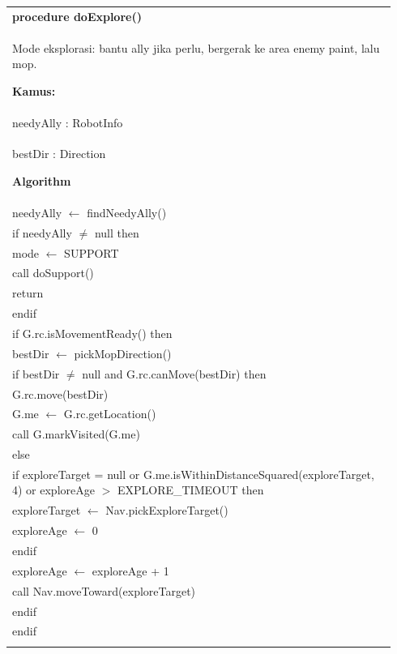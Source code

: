 \documentclass{article}
\newenvironment{pseudobox}
{
\centering
\begin{longtable}{|p{0.94\linewidth}|}
\hline
}
{
\\ \hline
\end{longtable}
\vspace{0.05cm}
}
\begin{document}
\begin{pseudobox}
\textbf{procedure doExplore()} \\
{ Mode eksplorasi: bantu ally jika perlu, bergerak ke area enemy paint, lalu mop. }

\textbf{Kamus:} \\
\hspace*{1em} needyAlly : RobotInfo \\
\hspace*{1em} bestDir : Direction

\textbf{Algorithm} \\
\hspace*{1em} needyAlly $\leftarrow$ findNeedyAlly() \\
\hspace*{1em} if needyAlly $\neq$ null then \\
\hspace*{2em} mode $\leftarrow$ SUPPORT \\
\hspace*{2em} call doSupport() \\
\hspace*{2em} return \\
\hspace*{1em} endif \\

\hspace*{1em} if G.rc.isMovementReady() then \\
\hspace*{2em} bestDir $\leftarrow$ pickMopDirection() \\
\hspace*{2em} if bestDir $\neq$ null and G.rc.canMove(bestDir) then \\
\hspace*{3em} G.rc.move(bestDir) \\
\hspace*{3em} G.me $\leftarrow$ G.rc.getLocation() \\
\hspace*{3em} call G.markVisited(G.me) \\
\hspace*{2em} else \\
\hspace*{3em} if exploreTarget = null or G.me.isWithinDistanceSquared(exploreTarget, 4) or exploreAge $>$ EXPLORE\_TIMEOUT then \\
\hspace*{4em} exploreTarget $\leftarrow$ Nav.pickExploreTarget() \\
\hspace*{4em} exploreAge $\leftarrow$ 0 \\
\hspace*{3em} endif \\
\hspace*{3em} exploreAge $\leftarrow$ exploreAge + 1 \\
\hspace*{3em} call Nav.moveToward(exploreTarget) \\
\hspace*{2em} endif \\
\hspace*{1em} endif \\


\end{pseudobox}
\end{document}
